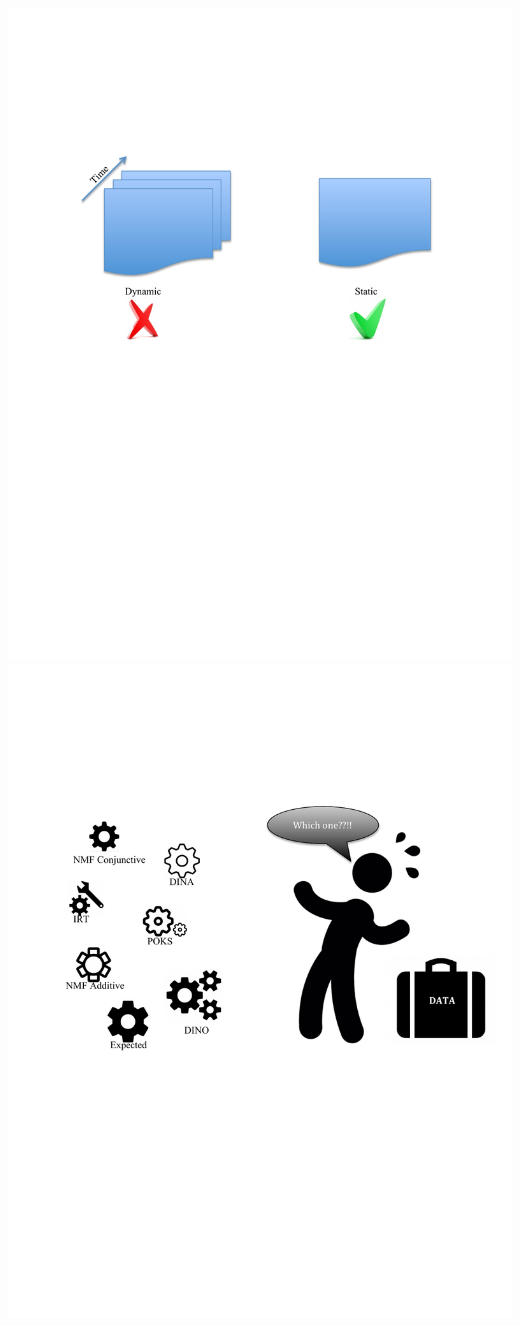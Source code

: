 \documentclass{beamer}
\begin{document}
\begin{frame}
\begin{overprint}
      	 \includegraphics[trim= 0cm 5cm 0cm 0cm , scale =0.5]{images/Dynamic-Syn}
       \includegraphics[trim= 0cm 0cm 0cm -3cm , scale =0.4]{images/Model-Selection}

\end{overprint}
\end{frame}
\end{document}

